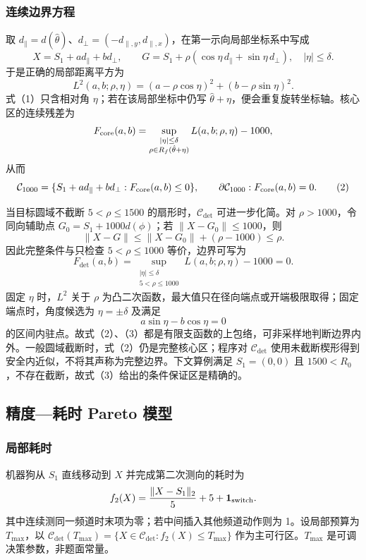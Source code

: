 \subsubsection{连续边界方程}
取 $d_\parallel=d(\hat\theta)$、$d_\perp=(-d_{\parallel,y},d_{\parallel,x})$，在第一示向局部坐标系中写成
\[
X=S_1+a d_\parallel+b d_\perp,\qquad
G=S_1+\rho(\cos\eta\,d_\parallel+\sin\eta\,d_\perp),\quad |\eta|\le\delta.
\]
于是正确的局部距离平方为
\[
L^2(a,b;\rho,\eta)
=(a-\rho\cos\eta)^2+(b-\rho\sin\eta)^2.                 \tag{1}
\]
式（1）只含相对角 $\eta$；若在该局部坐标中仍写 $\hat\theta+\eta$，便会重复旋转坐标轴。核心区的连续残差为
\[
F_{\rm core}(a,b)=
\sup_{\substack{|\eta|\le\delta\\ \rho\in R_f(\hat\theta+\eta)}}
L(a,b;\rho,\eta)-1000,
\]
从而
\[
\mathcal C_{1000}=\{S_1+a d_\parallel+b d_\perp:F_{\rm core}(a,b)\le0\},\qquad
\partial\mathcal C_{1000}:F_{\rm core}(a,b)=0.             \tag{2}
\]

当目标圆域不截断 $5<\rho\le1500$ 的扇形时，$\mathcal C_{\det}$ 可进一步化简。对 $\rho>1000$，令同向辅助点 $G_0=S_1+1000d(\phi)$；若 $\lVert X-G_0\rVert\le1000$，则
\[
\lVert X-G\rVert\le\lVert X-G_0\rVert+(\rho-1000)\le\rho.
\]
因此完整条件与只检查 $5<\rho\le1000$ 等价，边界可写为
\[
F_{\det}(a,b)=
\sup_{\substack{|\eta|\le\delta\\5<\rho\le1000}}
L(a,b;\rho,\eta)-1000=0.                                  \tag{3}
\]
固定 $\eta$ 时，$L^2$ 关于 $\rho$ 为凸二次函数，最大值只在径向端点或开端极限取得；固定端点时，角度候选为 $\eta=\pm\delta$ 及满足
\[
a\sin\eta-b\cos\eta=0
\]
的区间内驻点。故式（2）、（3）都是有限支函数的上包络，可非采样地判断边界内外。一般圆域截断时，式（2）仍是完整核心区；程序对 $\mathcal C_{\det}$ 使用未截断楔形得到安全内近似，不将其声称为完整边界。下文算例满足 $S_1=(0,0)$ 且 $1500<R_0$，不存在截断，故式（3）给出的条件保证区是精确的。

\subsection{精度—耗时 Pareto 模型}

\subsubsection{局部耗时}
机器狗从 $S_1$ 直线移动到 $X$ 并完成第二次测向的耗时为
\[
f_2(X)=\frac{\lVert X-S_1\rVert_2}{5}+5+\mathbf 1_{\rm switch}.
\]
其中连续测同一频道时末项为零；若中间插入其他频道动作则为 1。设局部预算为 $T_{\max}$，以 $\mathcal C_{\det}(T_{\max})=\{X\in\mathcal C_{\det}:f_2(X)\le T_{\max}\}$ 作为主可行区。$T_{\max}$ 是可调决策参数，非题面常量。

